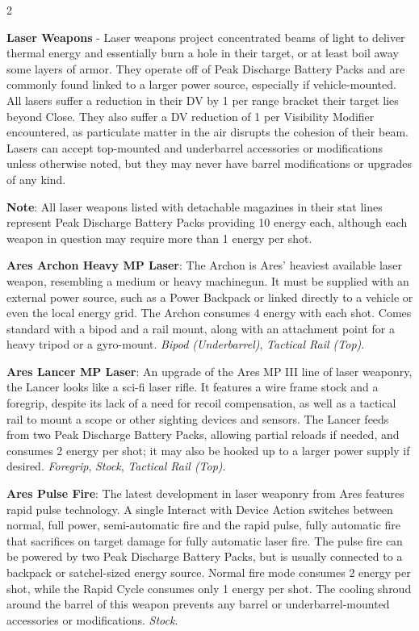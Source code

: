 \documentclass[
  oneside]{article}
\begin{document}
\begin{multicols}{2}

\textbf{Laser Weapons} - Laser weapons project
concentrated beams of light to deliver thermal
energy and essentially burn a hole in their
target, or at least boil away some layers of
armor. They operate off of Peak Discharge Battery
Packs and are commonly found linked to a larger
power source, especially if vehicle-mounted. All
lasers suffer a reduction in their DV by 1 per
range bracket their target lies beyond Close. They
also suffer a DV reduction of 1 per Visibility
Modifier encountered, as particulate matter in the
air disrupts the cohesion of their beam. Lasers
can accept top-mounted and underbarrel accessories
or modifications unless otherwise noted, but they
may never have barrel modifications or upgrades of
any kind.

\textbf{Note}: All laser weapons listed with
detachable magazines in their stat lines represent
Peak Discharge Battery Packs providing 10 energy
each, although each weapon in question may require
more than 1 energy per shot.

\textbf{Ares Archon Heavy MP Laser}: The Archon is
Ares' heaviest available laser weapon, resembling
a medium or heavy machinegun. It must be supplied
with an external power source, such as a Power
Backpack or linked directly to a vehicle or even
the local energy grid. The Archon consumes 4
energy with each shot. Comes standard with a bipod
and a rail mount, along with an attachment point
for a heavy tripod or a gyro-mount. \emph{Bipod
(Underbarrel)}, \emph{Tactical Rail (Top)}.

\textbf{Ares Lancer MP Laser}: An upgrade of the
Ares MP III line of laser weaponry, the Lancer
looks like a sci-fi laser rifle. It features a
wire frame stock and a foregrip, despite its lack
of a need for recoil compensation, as well as a
tactical rail to mount a scope or other sighting
devices and sensors. The Lancer feeds from two
Peak Discharge Battery Packs, allowing partial
reloads if needed, and consumes 2 energy per shot;
it may also be hooked up to a larger power supply
if desired. \emph{Foregrip}, \emph{Stock},
\emph{Tactical Rail (Top)}.

\textbf{Ares Pulse Fire}: The latest development
in laser weaponry from Ares features rapid pulse
technology. A single Interact with Device Action
switches between normal, full power,
semi-automatic fire and the rapid pulse, fully
automatic fire that sacrifices on target damage
for fully automatic laser fire. The pulse fire can
be powered by two Peak Discharge Battery Packs,
but is usually connected to a backpack or
satchel-sized energy source. Normal fire mode
consumes 2 energy per shot, while the Rapid Cycle
consumes only 1 energy per shot. The cooling
shroud around the barrel of this weapon prevents
any barrel or underbarrel-mounted accessories or
modifications. \emph{Stock}.


\end{multicols}
\end{document}
